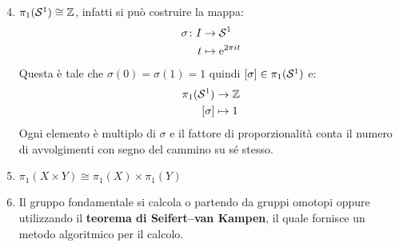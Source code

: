 \begin{enumerate}
  \setcounter{enumi}{3}
\item $ \pi_1(\mathcal{S}^{1}) \cong \mathbb{Z} $, infatti si può costruire la mappa:
  \begin{align*}
    \sigma \colon I & \to \mathcal{S}^{1} \\
    t & \mapsto  \mathrm{e}^{2 \pi i t}
  \end{align*}
  Questa è tale che $ \sigma(0) = \sigma(1) = 1 $ quindi $ [\sigma] \in \pi_1(\mathcal{S}^{1}) $ e:
  \begin{align*}
    \pi_1(\mathcal{S}^{1}) & \to \mathbb{Z} \\
    [\sigma] & \mapsto  1
  \end{align*}
  Ogni elemento è multiplo di $ \sigma $ e il fattore di proporzionalità conta il numero di avvolgimenti
  con segno del cammino su sé stesso.
\item $ \pi_1(X \times Y) \cong \pi_1(X) \times \pi_1(Y) $
\item Il gruppo fondamentale si calcola o partendo da gruppi omotopi oppure utilizzando il \textbf{teorema di Seifert–van Kampen}, 
  il quale fornisce un metodo algoritmico per il calcolo.
\end{enumerate}


